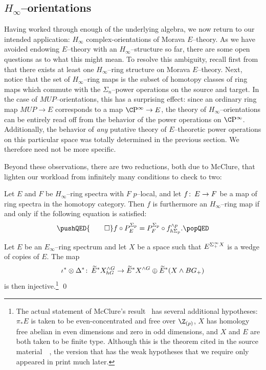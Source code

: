 \subsection*{\(H_\infty\)--orientations}

Having worked through enough of the underlying algebra, we now return to our intended application: \(H_\infty\) complex-orientations of Morava \(E\)--theory.  As we have avoided endowing \(E\)--theory with an \(H_\infty\)--structure so far, there are some open questions as to what this might mean.  To resolve this ambiguity, recall first from  that there exists at least one \(H_\infty\)--ring structure on Morava \(E\)--theory.  Next, notice that the set of \(H_\infty\)--ring maps is the subset of homotopy classes of ring maps which commute with the \(\Sigma_n\)--power operations on the source and target.  In the case of \(MUP\)--orientations, this has a surprising effect: since an ordinary ring map \(MUP \to E\) corresponds to a map \(\CP^\infty \to E\), the theory of \(H_\infty\)--orientations can be entirely read off from the behavior of the power operations on \(\CP^\infty\).  Additionally, the behavior of \emph{any} putative theory of \(E\)--theoretic power operations on this particular space was totally determined in the previous section.  We therefore need not be more specific.

Beyond these observations, there are two reductions, both due to McClure, that lighten our workload from infinitely many conditions to check to two:

\begin{theorem}
Let \(E\) and \(F\) be \(H_\infty\)--ring spectra with \(F\) \(p\)--local, and let \(f\colon\thinspace E \to F\) be a map of ring spectra in the homotopy category.  Then \(f\) is furthermore an \(H_\infty\)--ring map if and only if the following equation is satisfied:
\[
\pushQED{\qed}
f \circ P^{\Sigma_p}_E = P^{\Sigma_p}_F \circ f^{\sm p}_{h\Sigma_p}. \qedhere
\popQED
\]
\end{theorem}

\begin{theorem}
Let \(E\) be an \(E_\infty\)--ring spectrum and let \(X\) be a space such that \(E^{\Sigma^\infty_+ X}\) is a wedge of copies of \(E\).  The map \[\iota^* \otimes \Delta^*\colon\thinspace \widetilde E^* X^{\wedge G}_{hG} \to \widetilde E^* X^{\wedge G} \oplus \widetilde E^*(X \wedge BG_+)\] is then injective.\footnote{The actual statement of McClure's result~\cite[Proposition VIII.7.3]{BMMS} has several additional hypotheses: \(\pi_* E\) is taken to be even-concentrated and free over \(\Z_{(p)}\), \(X\) has homology free abelian in even dimensions and zero in odd dimensions, and \(X\) and \(E\) are both taken to be finite type.  Although this is the theorem cited in the source material~\cite[Section 4]{Ando}~\cite[Proof of Proposition 6.1]{AHSHinfty}, the version that has the weak hypotheses that we require only appeared in print much later.} \qed
\end{theorem}

